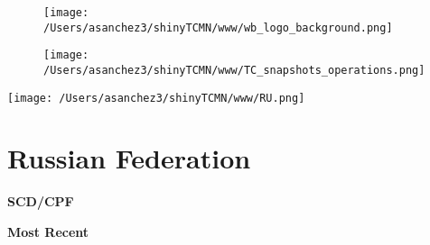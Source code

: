 \documentclass{article}\usepackage[]{graphicx}\usepackage[]{color}
\begin{document}
\newpage
\begin{figure}
  \vspace{-3ex} %
  \hspace{-7ex} %
  \texttt{[image: /Users/asanchez3/shinyTCMN/www/wb\_logo\_background.png]}
\end{figure}
\begin{figure}
  \begin{minipage}[t]{0.99\textwidth} %
      \vspace{-30ex}
      \hspace{-2ex}
      \raggedright{\texttt{[image: /Users/asanchez3/shinyTCMN/www/TC\_snapshots\_operations.png]}}
  \end{minipage}
\end{figure}
%
\begin{minipage}[t]{0.99\textwidth} %
  \vspace{-1.5cm}
  \begin{minipage}[c]{0.36\textwidth} 
    \begin{minipage}[c]{0.28\textwidth} %
      \texttt{[image: /Users/asanchez3/shinyTCMN/www/RU.png]}
    \end{minipage}
    \begin{minipage}[c]{0.70\textwidth} %
      \section*{\color{blue!40!black}Russian Federation}
    \end{minipage}
  \end{minipage}
  \begin{minipage}[c]{0.63\textwidth}
  \end{minipage}  
\end{minipage} %

  \raggedright{\color{white!30!blue} \textbf{\Large SCD/CPF}}
    \begin{minipage}[c]{0.99\textwidth}  
      \vspace*{0.2cm}
      \raggedright{\color{white!30!blue} \textbf{\large Most Recent}}
      \vspace*{0.3cm}
      

      \vspace*{0.5cm}
    \end{minipage}
    
\end{document}

